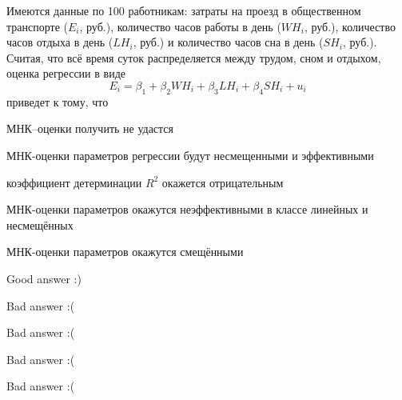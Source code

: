 
\begin{question}
Имеются данные по 100 работникам: затраты на проезд в общественном транспорте (\(E_i\), руб.),
количество часов работы в день (\(WH_i\), руб.),
количество часов отдыха в день (\(LH_i\), руб.) и
количество часов сна в день (\(SH_i\), руб.).
Считая, что всё время суток распределяется между трудом, сном и отдыхом,
оценка регрессии в виде
\[
E_i = {\beta_1} + {\beta_2}WH_i + {\beta _3}LH_i + {\beta _4}SH_i + u_i
\]
приведет к тому, что
\begin{answerlist}
  \item МНК--оценки получить не удастся
  \item МНК-оценки параметров регрессии будут несмещенными и эффективными
  \item коэффициент детерминации \(R^2\) окажется отрицательным
  \item МНК-оценки параметров окажутся неэффективными в классе линейных и несмещённых
  \item МНК-оценки параметров окажутся смещёнными
\end{answerlist}
\end{question}

\begin{solution}
\begin{answerlist}
  \item Good answer :)
  \item Bad answer :(
  \item Bad answer :(
  \item Bad answer :(
  \item Bad answer :(
\end{answerlist}
\end{solution}

